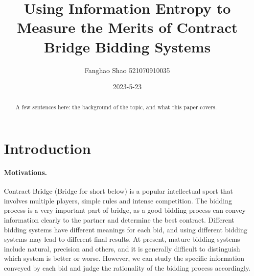 \documentclass[11pt]{article}
\begin{document}

\title{Using Information Entropy to Measure the Merits of Contract Bridge Bidding Systems}

\author{Fanghao Shao 521070910035}

\date{2023-5-23}
\maketitle

\begin{abstract}
A few sentences here: the background of the topic, and what this paper covers.
\end{abstract}


\section{Introduction}\label{sec:intro}
\paragraph{Motivations.}
Contract Bridge (Bridge for short below) is a popular intellectual sport that involves multiple players, simple rules and intense competition. The bidding process is a very important part of bridge, as a good bidding process can convey information clearly to the partner and determine the best contract. Different bidding systems have different meanings for each bid, and using different bidding systems may lead to different final results. At present, mature bidding systems include natural, precision and others, and it is generally difficult to distinguish which system is better or worse. However, we can study the specific information conveyed by each bid and judge the rationality of the bidding process accordingly.
\end{document}
